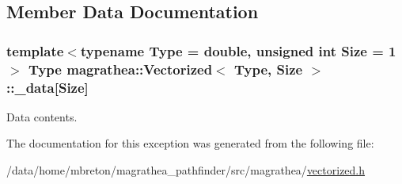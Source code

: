 \subsection{Member Data Documentation}
\hypertarget{exceptionmagrathea_1_1Vectorized_a807e70ab36b29bab3d7985120a741254}{
\subsubsection[{\-\_\-data}]{\setlength{\rightskip}{0pt plus 5cm}template$<$typename Type = double, unsigned int Size = 1$>$ Type {\bf magrathea\-::\-Vectorized}$<$ Type, Size $>$\-::\-\_\-data\mbox{[}Size\mbox{]}\hspace{0.3cm}{\ttfamily [protected]}}}\label{exceptionmagrathea_1_1Vectorized_a807e70ab36b29bab3d7985120a741254}


Data contents. 



The documentation for this exception was generated from the following file\-:\begin{DoxyCompactItemize}
\item 
/data/home/mbreton/magrathea\-\_\-pathfinder/src/magrathea/\hyperlink{vectorized_8h}{vectorized.\-h}\end{DoxyCompactItemize}
